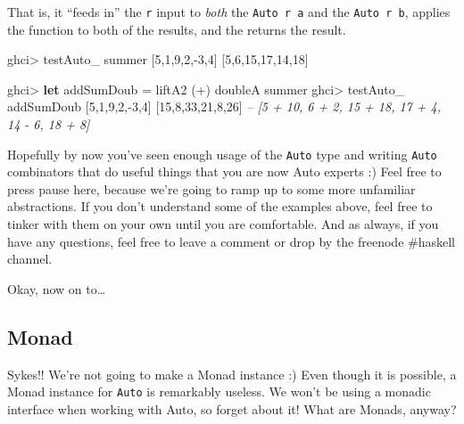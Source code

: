 \documentclass[]{article}
\newenvironment{Shaded}{}{}
\newcommand{\CommentTok}[1]{\textcolor[rgb]{0.38,0.63,0.69}{\textit{#1}}}
\newcommand{\DecValTok}[1]{\textcolor[rgb]{0.25,0.63,0.44}{#1}}
\newcommand{\FunctionTok}[1]{\textcolor[rgb]{0.02,0.16,0.49}{#1}}
\newcommand{\KeywordTok}[1]{\textcolor[rgb]{0.00,0.44,0.13}{\textbf{#1}}}
\newcommand{\NormalTok}[1]{#1}
\begin{document}
That is, it ``feeds in'' the \texttt{r} input to \emph{both} the
\texttt{Auto\ r\ a} and the \texttt{Auto\ r\ b}, applies the function to both of
the results, and the returns the result.

\begin{Shaded}
\begin{Highlighting}[]
\NormalTok{ghci}\FunctionTok{>}\NormalTok{ testAuto_ summer [}\DecValTok{5}\NormalTok{,}\DecValTok{1}\NormalTok{,}\DecValTok{9}\NormalTok{,}\DecValTok{2}\NormalTok{,}\FunctionTok{-}\DecValTok{3}\NormalTok{,}\DecValTok{4}\NormalTok{]}
\NormalTok{[}\DecValTok{5}\NormalTok{,}\DecValTok{6}\NormalTok{,}\DecValTok{15}\NormalTok{,}\DecValTok{17}\NormalTok{,}\DecValTok{14}\NormalTok{,}\DecValTok{18}\NormalTok{]}

\NormalTok{ghci}\FunctionTok{>} \KeywordTok{let}\NormalTok{ addSumDoub }\FunctionTok{=}\NormalTok{ liftA2 (}\FunctionTok{+}\NormalTok{) doubleA summer}
\NormalTok{ghci}\FunctionTok{>}\NormalTok{ testAuto_ addSumDoub [}\DecValTok{5}\NormalTok{,}\DecValTok{1}\NormalTok{,}\DecValTok{9}\NormalTok{,}\DecValTok{2}\NormalTok{,}\FunctionTok{-}\DecValTok{3}\NormalTok{,}\DecValTok{4}\NormalTok{]}
\NormalTok{[}\DecValTok{15}\NormalTok{,}\DecValTok{8}\NormalTok{,}\DecValTok{33}\NormalTok{,}\DecValTok{21}\NormalTok{,}\DecValTok{8}\NormalTok{,}\DecValTok{26}\NormalTok{]}
\CommentTok{-- [5 + 10, 6 + 2, 15 + 18, 17 + 4, 14 - 6, 18 + 8]}
\end{Highlighting}
\end{Shaded}

Hopefully by now you've seen enough usage of the \texttt{Auto} type and writing
\texttt{Auto} combinators that do useful things that you are now Auto experts :)
Feel free to press pause here, because we're going to ramp up to some more
unfamiliar abstractions. If you don't understand some of the examples above,
feel free to tinker with them on your own until you are comfortable. And as
always, if you have any questions, feel free to leave a comment or drop by the
freenode \#haskell channel.

Okay, now on to\ldots{}

\hypertarget{monad}{%
\subsection{Monad}\label{monad}}

Sykes!! We're not going to make a Monad instance :) Even though it is possible,
a Monad instance for \texttt{Auto} is remarkably useless. We won't be using a
monadic interface when working with Auto, so forget about it! What are Monads,
anyway?
\end{document}
